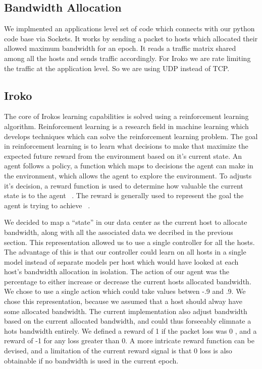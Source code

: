 \subsection{Bandwidth Allocation}
We implmented an applications level set of code which connects with our python code base via Sockets. It works by sending a packet to hosts which allocated their allowed maximum bandwidth for an epoch. It reads a traffic matrix shared among all the hosts and sends traffic accordingly. For Iroko we are rate limiting the traffic at the application level. So we are using UDP instead of TCP.


\subsection{Iroko}

The core of Irokos learning capabilities is solved using a reinforcement learning algorithm. Reinforcement learning is a research field in machine learning which develops techniques which can solve the reinforcement learning problem. The goal in reinforcement learning is to learn what decisions to make that maximize the expected future reward from the environment based on it’s current state. An agent follows a policy, a function which maps to decisions the agent can make in the environment, which allows the agent to explore the environment. To adjusts it’s decision, a reward function is used to determine how valuable the current state is to the agent ~\cite{Sutton:1998:IRL:551283}. The reward is generally used to represent the goal the agent is trying to achieve ~\cite{Sutton:1998:IRL:551283}. 

We decided to map a “state” in our data center as the current host to allocate bandwidth, along with all the associated data we decribed in the previous section. This representation allowed us to use a single controller for all the hosts. The advantage of this is that our controller could learn on all hosts in a single model instead of separate models per host which would have looked at each host’s bandwidth allocation in isolation. The action of our agent was the percentage to either increase or decrease the current hosts allocated bandwidth. We chose to use a single action which could take values betwen -.9 and .9.  We chose this representation, because we assumed that a host should alway have some allocated bandwidth. The current implementation also adjust bandwidth based on the current allocated bandwidth, and could thus forseeably elimnate a hots bandwidth entirely. We defined  a reward of 1 if the packet loss was 0 , and a reward of -1 for any loss greater than 0.   A more intricate reward function can be devised, and a limitation of the current reward signal is that 0 loss is also obtainable if no bandwidth is used in the current epoch. 



